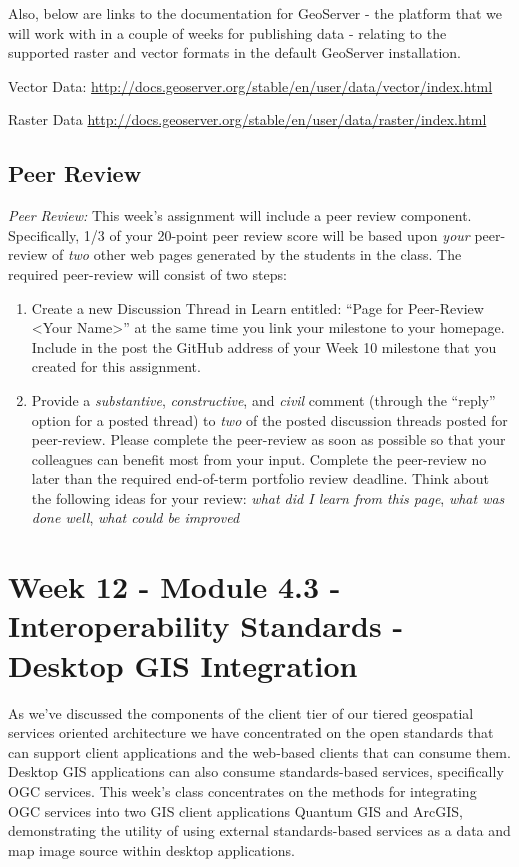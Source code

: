 \documentclass[]{book}
\begin{document}
Also, below are links to the documentation for GeoServer - the platform
that we will work with in a couple of weeks for publishing data -
relating to the supported raster and vector formats in the default
GeoServer installation.

Vector Data:
\url{http://docs.geoserver.org/stable/en/user/data/vector/index.html}

Raster Data
\url{http://docs.geoserver.org/stable/en/user/data/raster/index.html}

\section{Peer Review}\label{peer-review-1}

\emph{Peer Review:} This week's assignment will include a peer review
component. Specifically, 1/3 of your 20-point peer review score will be
based upon \emph{your} peer-review of \emph{two} other web pages
generated by the students in the class. The required peer-review will
consist of two steps:

\begin{enumerate}
\def\labelenumi{\arabic{enumi}.}
\item
  Create a new Discussion Thread in Learn entitled: ``Page for
  Peer-Review \textless{}Your Name\textgreater{}'' at the same time you
  link your milestone to your homepage. Include in the post the GitHub
  address of your Week 10 milestone that you created for this
  assignment.
\item
  Provide a \emph{substantive}, \emph{constructive}, and \emph{civil}
  comment (through the ``reply'' option for a posted thread) to
  \emph{two} of the posted discussion threads posted for peer-review.
  Please complete the peer-review as soon as possible so that your
  colleagues can benefit most from your input. Complete the peer-review
  no later than the required end-of-term portfolio review deadline.
  Think about the following ideas for your review: \emph{what did I
  learn from this page}, \emph{what was done well}, \emph{what could be
  improved}
\end{enumerate}

\chapter{Week 12 - Module 4.3 - Interoperability Standards - Desktop GIS
Integration}\label{week12}

As we've discussed the components of the client tier of our tiered
geospatial services oriented architecture we have concentrated on the
open standards that can support client applications and the web-based
clients that can consume them. Desktop GIS applications can also consume
standards-based services, specifically OGC services. This week's class
concentrates on the methods for integrating OGC services into two GIS
client applications Quantum GIS and ArcGIS, demonstrating the utility of
using external standards-based services as a data and map image source
within desktop applications.
\end{document}
